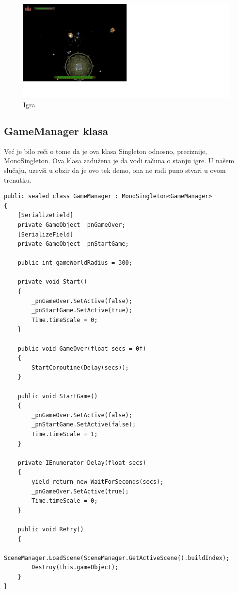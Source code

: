 \begin{center}
    \begin{figure}
        \includegraphics[width=2\textwidth]{Figures/GameScr_01.png}
        \caption{Igra}
        \label{fig:gamescr_01}
    \end{figure}
\end{center}


\subsection{GameManager klasa}
\label{gamemanager}
Ve\'c je bilo re\v{c}i o tome da je ova klasa Singleton odnosno, preciznije, MonoSingleton. Ova klasa zadu\v{z}ena je da
vodi ra\v{c}una o stanju igre. U na\v{s}em slu\v{c}aju, uzev\v{s}i u obzir da je ovo tek demo, ona ne radi puno stvari u ovom trenutku.

\pagebreak

\begin{verbatim}
public sealed class GameManager : MonoSingleton<GameManager>
{
    [SerializeField]
    private GameObject _pnGameOver;
    [SerializeField]
    private GameObject _pnStartGame;

    public int gameWorldRadius = 300;

    private void Start()
    {
        _pnGameOver.SetActive(false);
        _pnStartGame.SetActive(true);
        Time.timeScale = 0;
    }

    public void GameOver(float secs = 0f)
    {
        StartCoroutine(Delay(secs));
    }

    public void StartGame()
    {
        _pnGameOver.SetActive(false);
        _pnStartGame.SetActive(false);
        Time.timeScale = 1;
    }

    private IEnumerator Delay(float secs)
    {
        yield return new WaitForSeconds(secs);
        _pnGameOver.SetActive(true);
        Time.timeScale = 0;
    }

    public void Retry()
    {
        SceneManager.LoadScene(SceneManager.GetActiveScene().buildIndex);
        Destroy(this.gameObject);
    }
}
\end{verbatim}

